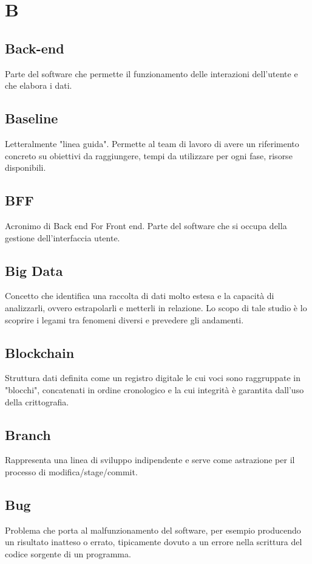 \section*{B}
\markright{}

\subsection*{Back-end}
Parte del software che permette il funzionamento delle interazioni dell'utente e che elabora i dati.

\subsection*{Baseline}
Letteralmente "linea guida". Permette al team di lavoro di avere un riferimento concreto su obiettivi da raggiungere, tempi da utilizzare per ogni fase, risorse disponibili. 

\subsection*{BFF}
Acronimo di Back end For Front end. Parte del software che si occupa della gestione dell'interfaccia utente.

\subsection*{Big Data}
Concetto che identifica una raccolta di dati molto estesa e la capacità di analizzarli, ovvero estrapolarli e metterli in relazione. Lo scopo di tale studio è lo scoprire i legami tra fenomeni diversi e prevedere gli andamenti.

\subsection*{Blockchain}
Struttura dati definita come un registro digitale le cui voci sono raggruppate in "blocchi", concatenati in ordine cronologico e la cui integrità è garantita dall'uso della crittografia.

\subsection*{Branch}
Rappresenta una linea di sviluppo indipendente e serve come astrazione per il processo di modifica/stage/commit.

\subsection*{Bug}
Problema che porta al malfunzionamento del software, per esempio producendo un risultato inatteso o errato, tipicamente dovuto a un errore nella scrittura del codice sorgente di un programma. 




